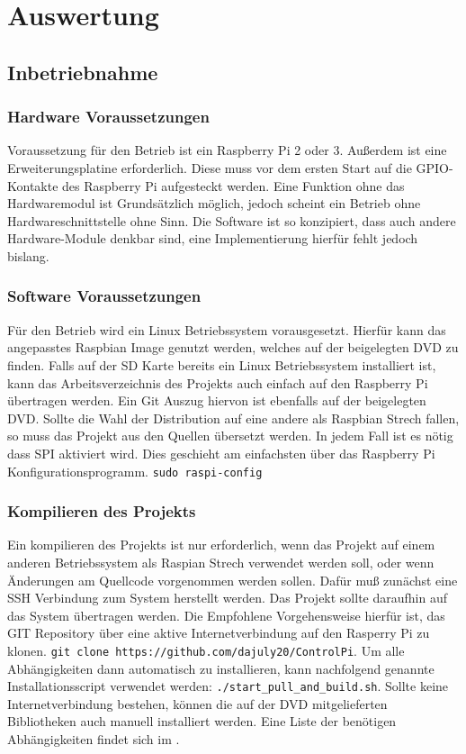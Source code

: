 \section{Auswertung}\label{kap:ausw}
 \subsection{Inbetriebnahme}
 \subsubsection{Hardware Voraussetzungen}
 Voraussetzung für den Betrieb ist ein Raspberry Pi 2 oder 3. Außerdem ist eine Erweiterungsplatine  erforderlich. Diese muss vor dem ersten Start auf die GPIO-Kontakte des Raspberry Pi aufgesteckt werden. Eine Funktion ohne das Hardwaremodul ist Grundsätzlich möglich, jedoch scheint ein Betrieb ohne Hardwareschnittstelle ohne Sinn. Die Software ist so konzipiert, dass auch andere Hardware-Module denkbar sind, eine Implementierung hierfür fehlt jedoch bislang.     
 \subsubsection{Software Voraussetzungen}
 Für den Betrieb wird ein Linux Betriebssystem vorausgesetzt. Hierfür kann das angepasstes Raspbian \cite{URL:Raspian} Image genutzt werden, welches auf der beigelegten DVD zu finden. Falls auf der SD Karte bereits ein Linux Betriebssystem installiert ist, kann das Arbeitsverzeichnis des Projekts auch einfach auf den Raspberry Pi übertragen werden. Ein Git Auszug hiervon ist ebenfalls auf der beigelegten DVD. Sollte die Wahl der Distribution auf eine andere als Raspbian Strech \cite{URL:Raspian} fallen, so muss das Projekt aus den Quellen übersetzt werden. In jedem Fall ist es nötig dass SPI aktiviert wird. Dies geschieht am einfachsten über das Raspberry Pi Konfigurationsprogramm. \texttt{sudo raspi-config} 
 \subsubsection{Kompilieren des Projekts}
 Ein kompilieren des Projekts ist nur erforderlich, wenn das Projekt auf einem anderen Betriebssystem als Raspian Strech \cite{URL:Raspian} verwendet werden soll, oder wenn Änderungen am Quellcode vorgenommen werden sollen.  
 Dafür muß zunächst eine SSH Verbindung zum System herstellt werden. Das Projekt sollte daraufhin auf das System übertragen werden. Die Empfohlene Vorgehensweise hierfür ist, das GIT Repository über eine aktive Internetverbindung auf den Rasperry Pi zu klonen. \texttt{git clone https://github.com/dajuly20/ControlPi}. Um alle Abhängigkeiten dann automatisch zu installieren, kann nachfolgend genannte Installationsscript verwendet werden: \texttt{./start\_pull\_and\_build.sh}. Sollte keine Internetverbindung bestehen, können die auf der DVD mitgelieferten Bibliotheken auch manuell installiert werden. 
 Eine Liste der benötigen Abhängigkeiten findet sich im .  
